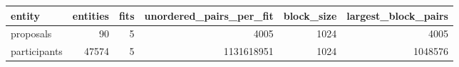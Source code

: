 \begin{tabular}{lrrrrr}
\toprule
entity & entities & fits & unordered_pairs_per_fit & block_size & largest_block_pairs \\
\midrule
proposals & 90 & 5 & 4005 & 1024 & 4005 \\
participants & 47574 & 5 & 1131618951 & 1024 & 1048576 \\
\bottomrule
\end{tabular}
